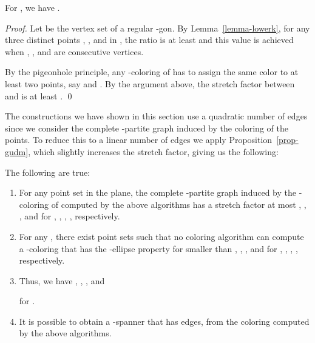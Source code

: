 \documentclass[pdftex,leqno,fleqn,12pts]{llncs}
\begin{document}
\begin{lemma}  \label{prop-lbkoff} 
For , we have .
\end{lemma}
\begin{proof} 
Let  be the vertex set of a regular 
-gon. 
By Lemma~\ref{lemma-lowerk}, for any three distinct 
points , , and  in , 
the ratio  is at least  and 
this value is achieved when , , and  are 
consecutive vertices. 


By the pigeonhole principle, any -coloring of  has to assign the 
same color to at least two points, say  and . By the argument 
above, the stretch factor between  and  is at least 
.
\qed 
\end{proof}






The constructions we have shown in this section use a quadratic number of edges since we 
consider the complete -partite graph induced by the coloring of the points. 
To reduce this to a linear number of edges we apply Proposition~\ref{prop-gudm}, 
which slightly increases the stretch factor, giving us the following:




\begin{theorem}
The following are true:
\begin{enumerate}
\item 
For any point set  in the plane, the complete -partite graph induced by the -coloring 
of  computed by the above algorithms has a stretch factor at most
, , , and  for , ,
, , respectively. 



\item
For any , there exist point sets such that no coloring algorithm can 
compute a -coloring that has the -ellipse property for  smaller than
, , , and  
for , , , , respectively.



\item
Thus, we have
, , , and 
 
for .

\item
It is possible to obtain a -spanner that has  edges, 
from 
the coloring computed by the above algorithms.


\end{enumerate}
\end{theorem}
\end{document}
